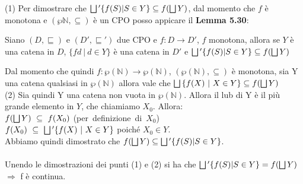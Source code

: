 {	(1) Per dimostrare che $\bigsqcup{}' \{f(S) | S \in{}Y\} \subseteq{} 
    f(\bigsqcup{}Y)$, dal momento che $f$ è monotona e 
    $(\wp{\mathbb{N}}, \subseteq{})$ è un CPO posso appicare il 
    \textbf{Lemma 5.30}:\\
    \begin{customlem}{5.30}
    Siano $(D, \sqsubseteq)$ e $(D', \sqsubseteq{}')$ due CPO e 
    $f:D\rightarrow{}D'$, $f$ monotona, allora se $Y$ è una catena in $D$, 
    $\{fd~|~d\in{}Y\}$ è una catena in $D'$ e $\bigsqcup{}' \{f(S) | S \in{}Y\} 
    \subseteq f(\bigsqcup{}Y)$
    \end{customlem}
    Dal momento che quindi $f:\wp{(\mathbb{N})}\rightarrow{}\wp{(\mathbb{N})}$,
    $(\wp{(\mathbb{N})}, \subseteq)$ è monotona, sia Y una catena qualsiasi in 
    $\wp{(\mathbb{N})}$ allora vale che $\bigsqcup{}\{f(X)~|~X\in{}Y\}\subseteq{}f(\bigsqcup{}Y)$\\
    
    (2) Sia quindi Y una catena non vuota in $\wp{(\mathbb{N})}$. Allora il lub
    di Y è il più grande elemento in $Y$, che chiamiamo $X_0$. Allora:\\
    \hspace*{1.5cm}$f(\bigsqcup{}Y)~\subseteq~f(X_0)$ (per~definizione~di~$X_0$)\\
    \hspace*{1.5cm}$f(X_0)~\subseteq~\bigsqcup{}'\{f(X)~|~X\in{}Y\}$ poiché $X_0\in{}Y$.\\
    Abbiamo quindi dimostrato che $f(\bigsqcup{}Y) \subseteq \bigsqcup{}' \{f(S) | S \in{}Y\}$.\\ \\
    
    Unendo le dimostrazioni dei punti (1) e (2) si ha che $\bigsqcup{}' \{f(S) | S \in{}Y\} = f(\bigsqcup{}Y)$ $\Rightarrow$ f è 	continua.

    
%
	
}
\newpage